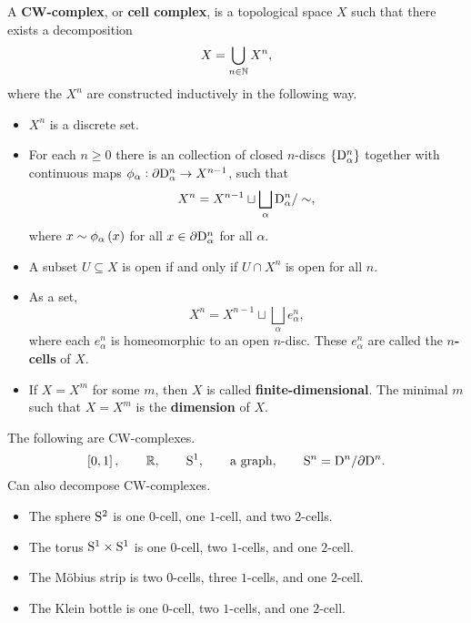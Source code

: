 \begin{definition*}
A \textbf{CW-complex}, or \textbf{cell complex}, is a topological space $ X $ such that there exists a decomposition
$$ X = \bigcup_{n \in \NN} X^n, $$
where the $ X^n $ are constructed inductively in the following way.
\begin{itemize}
\item $ X^n $ is a discrete set.
\item For each $ n \ge 0 $ there is an collection of closed $ n $-discs $ \cbr{\D_\alpha^n} $ together with continuous maps $ \phi_\alpha : \da \D_\alpha^n \to X^{n - 1} $, such that
$$ X^n = X^{n - 1} \sqcup \bigsqcup_\alpha \D_\alpha^n / \sim, $$
where $ x \sim \phi_\alpha\br{x} $ for all $ x \in \da \D_\alpha^n $ for all $ \alpha $.
\item A subset $ U \subseteq X $ is open if and only if $ U \cap X^n $ is open for all $ n $.
\end{itemize}
\end{definition*}

\pagebreak

\begin{remark*}
\hfill
\begin{itemize}
\item As a set,
$$ X^n = X^{n - 1} \sqcup \bigsqcup_\alpha e_\alpha^n, $$
where each $ e_\alpha^n $ is homeomorphic to an open $ n $-disc. These $ e_\alpha^n $ are called the \textbf{$ n $-cells} of $ X $.
\item If $ X = X^m $ for some $ m $, then $ X $ is called \textbf{finite-dimensional}. The minimal $ m $ such that $ X = X^m $ is the \textbf{dimension} of $ X $.
\end{itemize}
\end{remark*}

\begin{example*}
The following are CW-complexes.
$$ \sbr{0, 1}, \qquad \RR, \qquad \S^1, \qquad \text{a graph}, \qquad \S^n = \D^n / \da \D^n. $$
Can also decompose CW-complexes.
\begin{itemize}
\item The sphere $ \S^2 $ is one $ 0 $-cell, one $ 1 $-cell, and two $ 2 $-cells.
\item The torus $ \S^1 \times \S^1 $ is one $ 0 $-cell, two $ 1 $-cells, and one $ 2 $-cell.
\item The M\"obius strip is two $ 0 $-cells, three $ 1 $-cells, and one $ 2 $-cell.
\item The Klein bottle is one $ 0 $-cell, two $ 1 $-cells, and one $ 2 $-cell.
\end{itemize}
\end{example*}


